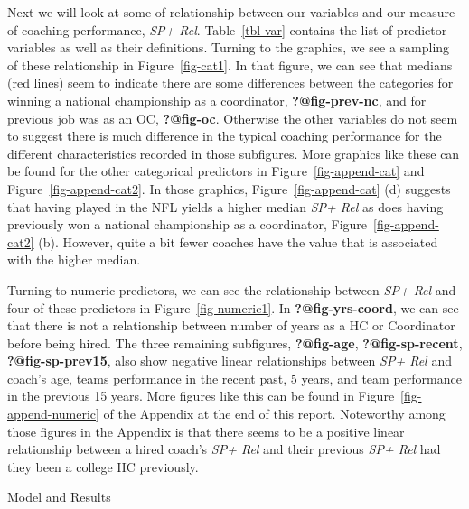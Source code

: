 \documentclass[
  12pt]{article}
\begin{document}
Next we will look at some of relationship between our variables and our
measure of coaching performance, \emph{SP+ Rel}. Table~\ref{tbl-var}
contains the list of predictor variables as well as their definitions.
Turning to the graphics, we see a sampling of these relationship in
Figure~\ref{fig-cat1}. In that figure, we can see that medians (red
lines) seem to indicate there are some differences between the
categories for winning a national championship as a coordinator,
\textbf{?@fig-prev-nc}, and for previous job was as an OC,
\textbf{?@fig-oc}. Otherwise the other variables do not seem to suggest
there is much difference in the typical coaching performance for the
different characteristics recorded in those subfigures. More graphics
like these can be found for the other categorical predictors in
Figure~\ref{fig-append-cat} and Figure~\ref{fig-append-cat2}. In those
graphics, Figure~\ref{fig-append-cat} (d) suggests that having played in
the NFL yields a higher median \emph{SP+ Rel} as does having previously
won a national championship as a coordinator,
Figure~\ref{fig-append-cat2} (b). However, quite a bit fewer coaches
have the value that is associated with the higher median.

Turning to numeric predictors, we can see the relationship between
\emph{SP+ Rel} and four of these predictors in
Figure~\ref{fig-numeric1}. In \textbf{?@fig-yrs-coord}, we can see that
there is not a relationship between number of years as a HC or
Coordinator before being hired. The three remaining subfigures,
\textbf{?@fig-age}, \textbf{?@fig-sp-recent}, \textbf{?@fig-sp-prev15},
also show negative linear relationships between \emph{SP+ Rel} and
coach's age, teams performance in the recent past, 5 years, and team
performance in the previous 15 years. More figures like this can be
found in Figure~\ref{fig-append-numeric} of the Appendix at the end of
this report. Noteworthy among those figures in the Appendix is that
there seems to be a positive linear relationship between a hired coach's
\emph{SP+ Rel} and their previous \emph{SP+ Rel} had they been a college
HC previously.

Model and Results
\end{document}
